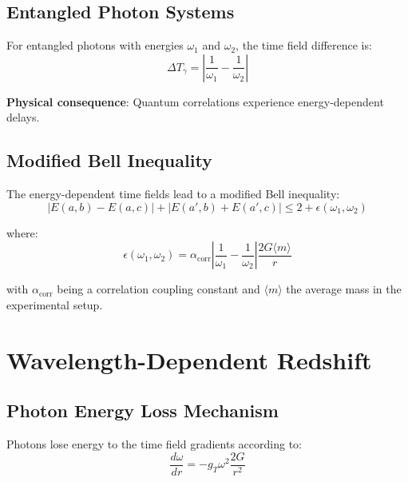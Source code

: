 \documentclass[12pt,a4paper]{article}
\begin{document}
	\subsection{Entangled Photon Systems}
	
	For entangled photons with energies $\omega_1$ and $\omega_2$, the time field difference is:
	\begin{equation}
		\Delta T_\gamma = \left|\frac{1}{\omega_1} - \frac{1}{\omega_2}\right|
		\label{eq:time_field_difference}
	\end{equation}
	
	\textbf{Physical consequence}: Quantum correlations experience energy-dependent delays.
	
	\subsection{Modified Bell Inequality}
	
	The energy-dependent time fields lead to a modified Bell inequality:
	\begin{equation}
		|E(a,b) - E(a,c)| + |E(a',b) + E(a',c)| \leq 2 + \epsilon(\omega_1, \omega_2)
		\label{eq:modified_bell_inequality}
	\end{equation}
	
	where:
	\begin{equation}
		\epsilon(\omega_1, \omega_2) = \alpha_{\text{corr}} \left|\frac{1}{\omega_1} - \frac{1}{\omega_2}\right| \frac{2G\langle m \rangle}{r}
		\label{eq:bell_correction}
	\end{equation}
	
	with $\alpha_{\text{corr}}$ being a correlation coupling constant and $\langle m \rangle$ the average mass in the experimental setup.
	
	\section{Wavelength-Dependent Redshift}
	
	\subsection{Photon Energy Loss Mechanism}
	
	Photons lose energy to the time field gradients according to:
	\begin{equation}
		\frac{d\omega}{dr} = -g_T \omega^2 \frac{2G}{r^2}
		\label{eq:photon_energy_loss}
	\end{equation}
	
\end{document}

